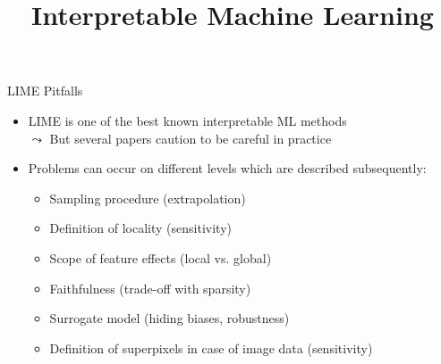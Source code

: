\documentclass[10pt,compress,t,notes=noshow, xcolor=table]{beamer}
\title{Interpretable Machine Learning}
\date{}
\begin{document}
	
	
	
	
	

	
	


\begin{frame}[c]{LIME Pitfalls}
  \begin{itemize}
  	\item %
  	LIME is one of the best known interpretable ML methods\\ 
  	$\leadsto$ But several papers caution to be careful in practice 
  	\item Problems can occur on different levels which are described subsequently: 
  	\begin{itemize}
  	    \item Sampling procedure (extrapolation)
  	    \item Definition of locality (sensitivity)
  	    \item Scope of feature effects (local vs. global)
  	    \item Faithfulness (trade-off with sparsity)
  	    \item Surrogate model (hiding biases, robustness)
  	    \item Definition of superpixels in case of image data (sensitivity)
  	\end{itemize}
  \end{itemize}
  
\end{frame}
  
\end{document}
